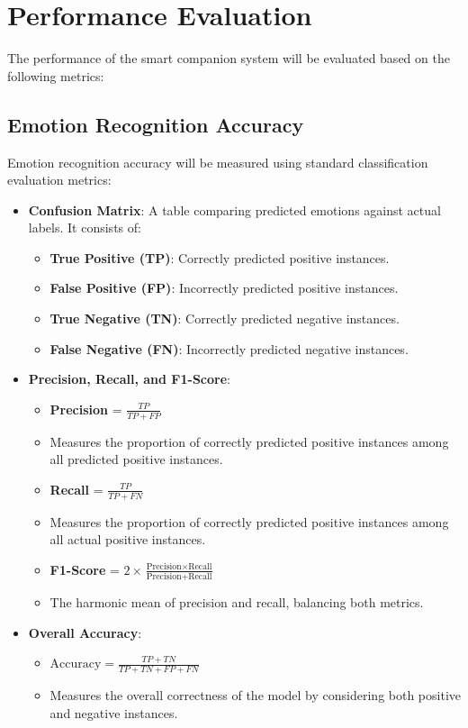 \section{Performance Evaluation}

The performance of the smart companion system will be evaluated based on the following metrics:

\subsection{Emotion Recognition Accuracy}

Emotion recognition accuracy will be measured using standard classification evaluation metrics:

\begin{itemize}
	\item \textbf{Confusion Matrix}: A table comparing predicted emotions against actual labels. It consists of:
	\begin{itemize}
		\item \textbf{True Positive (TP)}: Correctly predicted positive instances.
		\item \textbf{False Positive (FP)}: Incorrectly predicted positive instances.
		\item \textbf{True Negative (TN)}: Correctly predicted negative instances.
		\item \textbf{False Negative (FN)}: Incorrectly predicted negative instances.
	\end{itemize}
	\item \textbf{Precision, Recall, and F1-Score}:
	\begin{itemize}
		\item \textbf{Precision} = $\frac{TP}{TP + FP}$
		\item Measures the proportion of correctly predicted positive instances among all predicted positive instances.
		\item \textbf{Recall} = $\frac{TP}{TP + FN}$
		\item Measures the proportion of correctly predicted positive instances among all actual positive instances.
		\item \textbf{F1-Score} = $2 \times \frac{\text{Precision} \times \text{Recall}}{\text{Precision} + \text{Recall}}$
		\item The harmonic mean of precision and recall, balancing both metrics.
	\end{itemize}
	\item \textbf{Overall Accuracy}:
	\begin{itemize}
		\item $\text{Accuracy} = \frac{TP + TN}{TP + TN + FP + FN}$
		\item Measures the overall correctness of the model by considering both positive and negative instances.
	\end{itemize}
\end{itemize}

